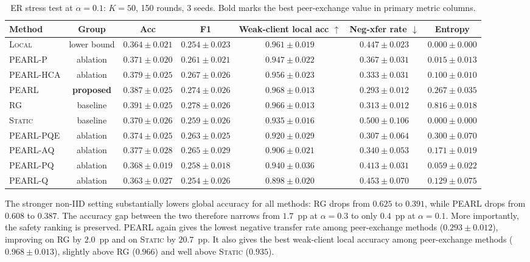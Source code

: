 \documentclass[conference]{IEEEtran}
\begin{document}
\begin{table}[t]
\centering
\caption{ER stress test at $\alpha=0.1$: $K=50$, 150 rounds, 3 seeds. Bold marks the best peer-exchange value in primary metric columns.}
\label{tab:er_alpha01_results}
\renewcommand{\arraystretch}{1.18}
\setlength{\tabcolsep}{4pt}
\begin{tabular}{lcccccc}
\toprule
\textbf{Method} & \textbf{Group} & \textbf{Acc} & \textbf{F1} & \textbf{Weak-client local acc} $\uparrow$ & \textbf{Neg-xfer rate} $\downarrow$ & \textbf{Entropy} \\
\midrule
\textsc{Local} & lower bound & $0.364\pm0.021$ & $0.254\pm0.023$ & $0.961\pm0.019$ & $0.447\pm0.023$ & $0.000\pm0.000$ \\
\textsc{PEARL-P} & ablation & $0.371\pm0.020$ & $0.261\pm0.021$ & $0.947\pm0.022$ & $0.367\pm0.031$ & $0.015\pm0.013$ \\
\textsc{PEARL-HCA} & ablation & $0.379\pm0.025$ & $0.267\pm0.026$ & $0.956\pm0.023$ & $0.333\pm0.031$ & $0.100\pm0.010$ \\
\textsc{PEARL} & \textbf{proposed} & $0.387\pm0.025$ & $0.274\pm0.026$ & $\mathbf{0.968\pm0.013}$ & $\mathbf{0.293\pm0.012}$ & $0.267\pm0.035$ \\
\textsc{RG} & baseline & $\mathbf{0.391\pm0.025}$ & $\mathbf{0.278\pm0.026}$ & $0.966\pm0.013$ & $0.313\pm0.012$ & $0.816\pm0.018$ \\
\textsc{Static} & baseline & $0.370\pm0.026$ & $0.259\pm0.026$ & $0.935\pm0.016$ & $0.500\pm0.106$ & $0.000\pm0.000$ \\
\textsc{PEARL-PQE} & ablation & $0.374\pm0.025$ & $0.263\pm0.025$ & $0.920\pm0.029$ & $0.307\pm0.064$ & $0.300\pm0.070$ \\
\textsc{PEARL-AQ} & ablation & $0.377\pm0.028$ & $0.265\pm0.029$ & $0.906\pm0.021$ & $0.340\pm0.053$ & $0.171\pm0.019$ \\
\textsc{PEARL-PQ} & ablation & $0.368\pm0.019$ & $0.258\pm0.018$ & $0.940\pm0.036$ & $0.413\pm0.031$ & $0.059\pm0.022$ \\
\textsc{PEARL-Q} & ablation & $0.363\pm0.027$ & $0.254\pm0.026$ & $0.898\pm0.020$ & $0.453\pm0.070$ & $0.129\pm0.075$ \\
\bottomrule
\end{tabular}
\end{table}

The stronger non-IID setting substantially lowers global accuracy for all methods: \textsc{RG} drops from $0.625$ to $0.391$, while \textsc{PEARL} drops from $0.608$ to $0.387$. The accuracy gap between the two therefore narrows from $1.7$~pp at $\alpha=0.3$ to only $0.4$~pp at $\alpha=0.1$. More importantly, the safety ranking is preserved. \textsc{PEARL} again gives the lowest negative transfer rate among peer-exchange methods ($0.293\pm0.012$), improving on \textsc{RG} by $2.0$~pp and on \textsc{Static} by $20.7$~pp. It also gives the best weak-client local accuracy among peer-exchange methods ($0.968\pm0.013$), slightly above \textsc{RG} ($0.966$) and well above \textsc{Static} ($0.935$).
\end{document}
